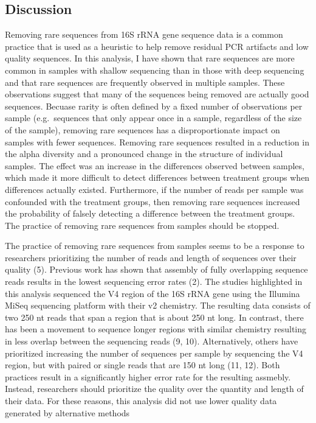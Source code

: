 \documentclass[
]{article}
\begin{document}
\hypertarget{discussion}{%
\subsection{Discussion}\label{discussion}}

Removing rare sequences from 16S rRNA gene sequence data is a common
practice that is used as a heuristic to help remove residual PCR
artifacts and low quality sequences. In this analysis, I have shown that
rare sequences are more common in samples with shallow sequencing than
in those with deep sequencing and that rare sequences are frequently
observed in multiple samples. These observations suggest that many of
the sequences being removed are actually good sequences. Becuase rarity
is often defined by a fixed number of observations per sample
(e.g.~sequences that only appear once in a sample, regardless of the
size of the sample), removing rare sequences has a disproportionate
impact on samples with fewer sequences. Removing rare sequences resulted
in a reduction in the alpha diversity and a pronounced change in the
structure of individual samples. The effect was an increase in the
differences observed between samples, which made it more difficult to
detect differences between treatment groups when differences actually
existed. Furthermore, if the number of reads per sample was confounded
with the treatment groups, then removing rare sequences increased the
probability of falsely detecting a difference between the treatment
groups. The practice of removing rare sequences from samples should be
stopped.

The practice of removing rare sequences from samples seems to be a
response to researchers prioritizing the number of reads and length of
sequences over their quality (5). Previous work has shown that assembly
of fully overlapping sequence reads results in the lowest sequencing
error rates (2). The studies highlighted in this analysis sequenced the
V4 region of the 16S rRNA gene using the Illumina MiSeq sequencing
platform with their v2 chemistry. The resulting data consists of two 250
nt reads that span a region that is about 250 nt long. In contrast,
there has been a movement to sequence longer regions with similar
chemistry resulting in less overlap between the sequencing reads (9,
10). Alternatively, others have prioritized increasing the number of
sequences per sample by sequencing the V4 region, but with paired or
single reads that are 150 nt long (11, 12). Both practices result in a
significantly higher error rate for the resulting assmebly. Instead,
researchers should prioritize the quality over the quantity and length
of their data. For these reasons, this analysis did not use lower
quality data generated by alternative methods
\end{document}
